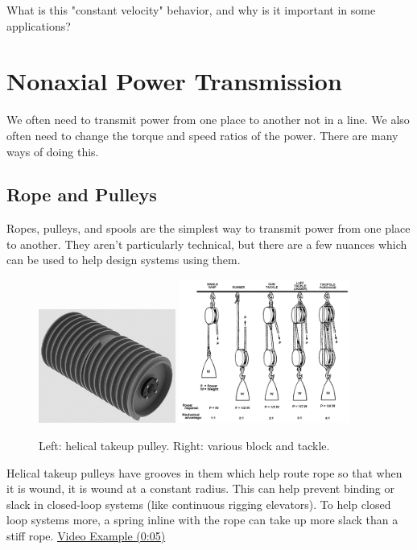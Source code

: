 	\begin{qbox}
		What is this "constant velocity" behavior, and why is it important in some applications?
	\end{qbox}

\section{Nonaxial Power Transmission}

We often need to transmit power from one place to another not in a line. We also often need to change the torque and speed ratios of the power. There are many ways of doing this.

\subsection{Rope and Pulleys}
Ropes, pulleys, and spools are the simplest way to transmit power from one place to another. They aren't particularly technical, but there are a few nuances which can be used to help design systems using them.

\begin{figure}[H]	
	\includegraphics[width=0.4\textwidth]{imgs/takeup_pulley.png}
	\includegraphics[width=0.5\textwidth]{imgs/block_tackle.png}
	\caption{Left: helical takeup pulley. Right: various block and tackle.}
\end{figure}

Helical takeup pulleys have grooves in them which help route rope so that when it is wound, it is wound at a constant radius. This can help prevent binding or slack in closed-loop systems (like continuous rigging elevators). To help closed loop systems more, a spring inline with the rope can take up more slack than a stiff rope. \href{https://youtu.be/kyfb8lGAveY?t=5}{\color{red}\underline{Video Example (0:05)}}


